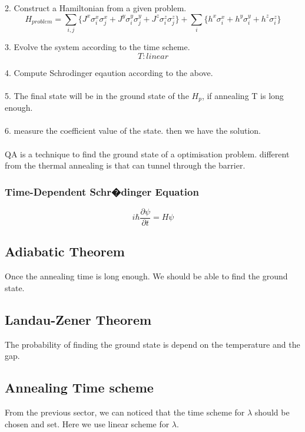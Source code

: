 \documentclass[twoside,a4paper,article]{combine}
\begin{document}
2. Construct a Hamiltonian from a given problem.
\begin{equation*}
	H_{problem}=\sum_{i,j} \{J^x \sigma^x_i \sigma^x_j+J^y \sigma^y_i \sigma^y_j+J^z \sigma^z_i \sigma^z_j \}+ \sum_{i} \{h^x \sigma^x_i+h^y \sigma^y_i+h^z \sigma^z_i\}
\end{equation*}   

3. Evolve the system according to the time scheme.
\begin{equation*}
	T:linear 
\end{equation*}

4. Compute Schrodinger eqaution according to the above.\\
\\
5. The final state will be in the ground state of the $H_p$, if annealing T is long enough.\\
\\
6. measure the coefficient value of the state. then we have the solution.\\
\\



QA is a technique to find the ground state of a optimisation problem. different from the thermal annealing is that can tunnel through the barrier. 


\subsubsection{Time-Dependent Schr�dinger Equation}
\begin{equation*}
i\hbar\frac{\partial \psi}{\partial t}=H\psi
\end{equation*}

\subsection{Adiabatic Theorem}
Once the annealing time is long enough. We should be able to find the ground state.
\subsection{Landau-Zener Theorem}
The probability of finding the ground state is depend on the temperature and the gap.

\subsection{Annealing Time scheme}
From the previous sector, we can noticed that the time scheme for $\lambda$ should be chosen and set. Here we use linear scheme for $\lambda$.
\end{document}
